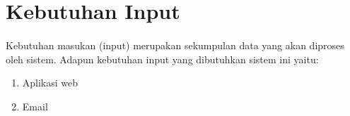 \documentclass[./bab_3.tex]{subfiles}
\begin{document}
\section{Kebutuhan Input}
\paragraph{}Kebutuhan masukan (input) merupakan sekumpulan
data yang akan diproses oleh sistem. Adapun kebutuhan input
yang dibutuhkan sistem ini yaitu:
\begin{enumerate}
  \item Aplikasi web
  \item Email
\end{enumerate}
\end{document}
